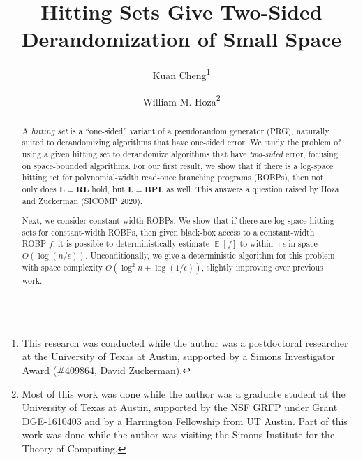 \documentclass{toc}
\DeclareMathOperator*{\ExpVal}{\mathbb{E}}
\begin{document}
\begin{frontmatter}%

%
%
%

%
\title{Hitting Sets Give Two-Sided Derandomization of Small Space}  %

%
%

%
%
%
%
%
%

%
%
%
%
%
%
%
%
%
%
%
%
	
	
%
%
%
%

%

\author[cheng]{Kuan Cheng\thanks{This research was conducted while the author was a postdoctoral researcher at the University of Texas at Austin, supported by a Simons Investigator Award (\#409864, David Zuckerman).}}
\author[hoza]{William M. Hoza\thanks{Most of this work was done while the author was a graduate student at the University of Texas at Austin, supported by the NSF GRFP under Grant DGE-1610403 and by a Harrington Fellowship from UT Austin. Part of this work was done while the author was visiting the Simons Institute for the Theory of Computing.}}

%
%
%
%

%
%
%
%
%
%
%
%
\begin{abstract}
  A \emph{hitting set} is a ``one-sided'' variant of a pseudorandom generator (PRG), naturally suited to derandomizing algorithms that have one-sided error. We study the problem of using a given hitting set to derandomize algorithms that have \emph{two-sided} error, focusing on space-bounded algorithms. For our first result, we show that if there is a log-space hitting set for polynomial-width read-once branching programs (ROBPs), then not only does $\mathbf{L} = \mathbf{RL}$
hold, %
but $\mathbf{L} = \mathbf{BPL}$ as well. This answers a question raised by Hoza and Zuckerman (SICOMP 2020).

Next, we consider constant-width ROBPs. We show that if there are log-space hitting sets for constant-width ROBPs, then given black-box access to a constant-width ROBP $f$, it is possible to deterministically estimate $\ExpVal[f]$ to within $\pm \epsilon$ in space $O(\log(n/\epsilon))$. Unconditionally, we give a deterministic algorithm for this problem with space complexity $O(\log^2 n + \log(1/\epsilon))$, slightly improving over previous work.


\end{abstract}
\end{frontmatter}
\end{document}
